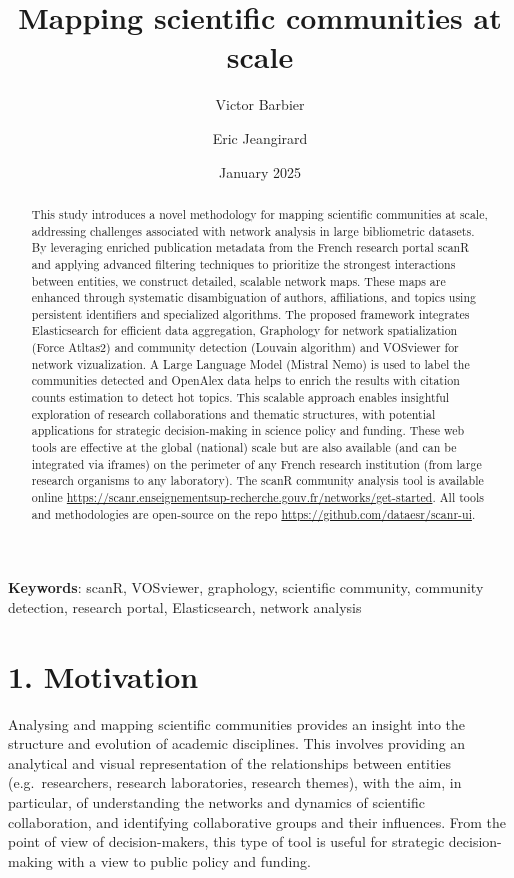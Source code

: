 \documentclass[
]{article}
\title{Mapping scientific communities at scale}
\author[%
  2%
  ]{%
  Victor Barbier%
}
\author[%
  1%
  ]{%
  Eric Jeangirard%
}
\affil[1]{French Ministry of Higher Education and Research, Paris,
France}
\affil[2]{National Institute for Research in Digital Science and
Technology, INRIA, Paris, France}
\date{January 2025}
\begin{document}
\maketitle
\begin{abstract}
This study introduces a novel methodology for mapping scientific
communities at scale, addressing challenges associated with network
analysis in large bibliometric datasets. By leveraging enriched
publication metadata from the French research portal scanR and applying
advanced filtering techniques to prioritize the strongest interactions
between entities, we construct detailed, scalable network maps. These
maps are enhanced through systematic disambiguation of authors,
affiliations, and topics using persistent identifiers and specialized
algorithms. The proposed framework integrates Elasticsearch for
efficient data aggregation, Graphology for network spatialization (Force
Atltas2) and community detection (Louvain algorithm) and VOSviewer for
network vizualization. A Large Language Model (Mistral Nemo) is used to
label the communities detected and OpenAlex data helps to enrich the
results with citation counts estimation to detect hot topics. This
scalable approach enables insightful exploration of research
collaborations and thematic structures, with potential applications for
strategic decision-making in science policy and funding. These web tools
are effective at the global (national) scale but are also available (and
can be integrated via iframes) on the perimeter of any French research
institution (from large research organisms to any laboratory). The scanR
community analysis tool is available online
\url{https://scanr.enseignementsup-recherche.gouv.fr/networks/get-started}.
All tools and methodologies are open-source on the repo
\url{https://github.com/dataesr/scanr-ui}.
\end{abstract}

\textbf{Keywords}: scanR, VOSviewer, graphology, scientific community,
community detection, research portal, Elasticsearch, network analysis

\hypertarget{motivation}{%
\section{1. Motivation}\label{motivation}}

Analysing and mapping scientific communities provides an insight into
the structure and evolution of academic disciplines. This involves
providing an analytical and visual representation of the relationships
between entities (e.g.~researchers, research laboratories, research
themes), with the aim, in particular, of understanding the networks and
dynamics of scientific collaboration, and identifying collaborative
groups and their influences. From the point of view of decision-makers,
this type of tool is useful for strategic decision-making with a view to
public policy and funding.
\end{document}

